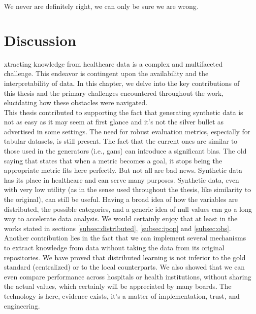 
\begin{savequote}[75mm]
We never are definitely right, we can only be sure we are wrong.
\end{savequote}
\chapter{Discussion} \label{chap:disc}



xtracting knowledge from healthcare data is a complex and multifaceted challenge. This endeavor is contingent upon the availability and the interpretability of data. In this chapter, we delve into the key contributions of this thesis and the primary challenges encountered throughout the work, elucidating how these obstacles were navigated. \\

This thesis contributed to supporting the fact that generating synthetic data is not as easy as it may seem at first glance and it's not the silver bullet as advertised in some settings. The need for robust evaluation metrics, especially for tabular datasets, is still present. The fact that the current ones are similar to those used in the generators (i.e., \acp{gan}) can introduce a significant bias. The old saying that states that when a metric becomes a goal, it stops being the appropriate metric fits here perfectly. But not all are bad news. Synthetic data has its place in healthcare and can serve many purposes. Synthetic data, even with very low utility (as in the sense used throughout the thesis, like similarity to the original), can still be useful. Having a broad idea of how the variables are distributed, the possible categories, and a generic idea of null values can go a long way to accelerate data analysis. We would certainly enjoy that at least in the works stated in sections \ref{subsec:distributed}, \ref{subsec:ipop} and \ref{subsec:obs}. \\

Another contribution lies in the fact that we can implement several mechanisms to extract knowledge from data without taking the data from its original repositories. We have proved that distributed learning is not inferior to the gold standard (centralized) or to the local counterparts. We also showed that we can even compare performance across hospitals or health institutions, without sharing the actual values, which certainly will be appreciated by many boards. The technology is here, evidence exists, it's a matter of implementation, trust, and engineering. \\

